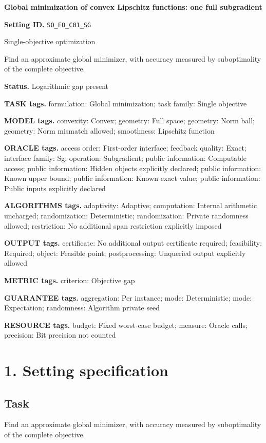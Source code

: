 \documentclass[10pt,a4paper]{article}
\begin{document}
\raggedright

{\LARGE\bfseries\sffamily\color{AtlasNavy} Global minimization of convex Lipschitz functions: one full subgradient\par}\vspace{5pt}
\textbf{Setting ID.} \texttt{SO\_\allowbreak{}FO\_\allowbreak{}C01\_\allowbreak{}SG}

Single-objective optimization

Find an approximate global minimizer, with accuracy measured by suboptimality of the complete objective.

\textbf{Status.} Logarithmic gap present

\textbf{TASK tags.} formulation: Global minimization; task family: Single objective

\textbf{MODEL tags.} convexity: Convex; geometry: Full space; geometry: Norm ball; geometry: Norm mismatch allowed; smoothness: Lipschitz function

\textbf{ORACLE tags.} access order: First-order interface; feedback quality: Exact; interface family: Sg; operation: Subgradient; public information: Computable access; public information: Hidden objects explicitly declared; public information: Known upper bound; public information: Known exact value; public information: Public inputs explicitly declared

\textbf{ALGORITHMS tags.} adaptivity: Adaptive; computation: Internal arithmetic uncharged; randomization: Deterministic; randomization: Private randomness allowed; restriction: No additional span restriction explicitly imposed

\textbf{OUTPUT tags.} certificate: No additional output certificate required; feasibility: Required; object: Feasible point; postprocessing: Unqueried output explicitly allowed

\textbf{METRIC tags.} criterion: Objective gap

\textbf{GUARANTEE tags.} aggregation: Per instance; mode: Deterministic; mode: Expectation; randomness: Algorithm private seed

\textbf{RESOURCE tags.} budget: Fixed worst-case budget; measure: Oracle calls; precision: Bit precision not counted

\section{1. Setting specification}
\subsection{Task}
Find an approximate global minimizer, with accuracy measured by suboptimality of the complete objective.
\end{document}
